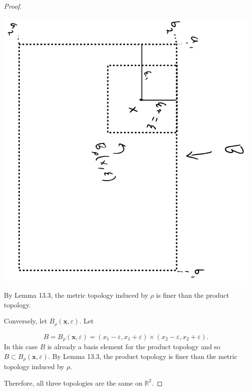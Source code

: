 \documentclass[12pt]{report}
\newcommand{\R}{\mathbb{R}^2}
\newcommand{\x}{\mathbf{x}}
\begin{document}
\begin{proof}
\begin{center}
	\includegraphics[scale=.65,angle=90]{pic3.png}
\end{center}
\vspace{2in}
By Lemma 13.3, the metric topology induced by $\rho$ is finer than the product topology.

Conversely, let $B_\rho (\x, \varepsilon)$. Let 

\[B= B_\rho(\x, \varepsilon) = (x_1 - \varepsilon , x_1 + \varepsilon) \times (x_2 - \varepsilon, x_2 + \varepsilon).\]
In this case $B$ is already a basis element for the product topology and so $B \subset B_\rho(\x, \varepsilon)$. By Lemma 13.3, the product topology is finer than the metric topology induced by $\rho$. 

Therefore, all three topologies are the same on $\R$.

\end{proof}
\end{document}
